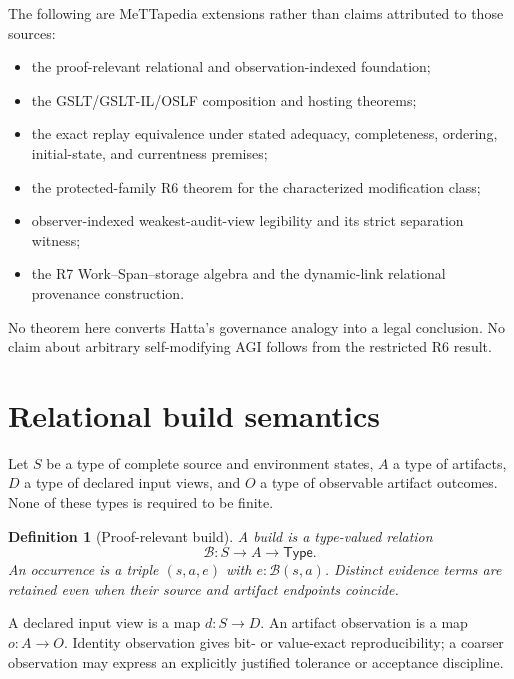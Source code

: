 \documentclass[11pt]{article}
\newtheorem{definition}{Definition}[section]
\newcommand{\Build}{\mathcal{B}}
\begin{document}
The following are MeTTapedia extensions rather than claims attributed to those
sources:

\begin{itemize}
  \item the proof-relevant relational and observation-indexed foundation;
  \item the GSLT/GSLT-IL/OSLF composition and hosting theorems;
  \item the exact replay equivalence under stated adequacy, completeness,
        ordering, initial-state, and currentness premises;
  \item the protected-family R6 theorem for the characterized modification
        class;
  \item observer-indexed weakest-audit-view legibility and its strict
        separation witness;
  \item the R7 Work--Span--storage algebra and the dynamic-link relational
        provenance construction.
\end{itemize}

No theorem here converts Hatta's governance analogy into a legal conclusion.
No claim about arbitrary self-modifying AGI follows from the restricted R6
result.

\section{Relational build semantics}

Let $S$ be a type of complete source and environment states, $A$ a type of
artifacts, $D$ a type of declared input views, and $O$ a type of observable
artifact outcomes.  None of these types is required to be finite.

\begin{definition}[Proof-relevant build]
A build is a type-valued relation
\[
  \Build : S \to A \to \mathsf{Type}.
\]
An occurrence is a triple $(s,a,e)$ with $e : \Build(s,a)$.  Distinct evidence
terms are retained even when their source and artifact endpoints coincide.
\end{definition}

A declared input view is a map $d:S\to D$.  An artifact observation is a map
$o:A\to O$.  Identity observation gives bit- or value-exact reproducibility;
a coarser observation may express an explicitly justified tolerance or
acceptance discipline.
\end{document}
